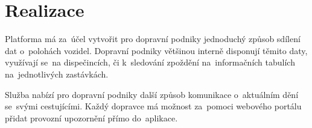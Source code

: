 \setlength{\headheight}{15.04742pt}
\chapter{Realizace}
Platforma má za~účel vytvořit pro dopravní podniky jednoduchý způsob sdílení dat o~polohách vozidel. Dopravní podniky většinou interně disponují těmito daty, využívají se~na dispečincích, či k~sledování zpoždění na~informačních tabulích na~jednotlivých zastávkách.\par
Služba nabízí pro dopravní podniky další způsob komunikace o~aktuálním dění se~svými cestujícími. Každý dopravce má možnost za~pomoci webového portálu přidat provozní upozornění přímo do~aplikace.




